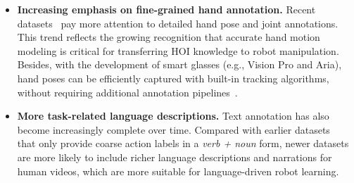 \documentclass[Afour,sageh,times]{sagej}
\begin{document}
\begin{itemize}[leftmargin=1em]
    \item \textbf{Increasing emphasis on fine-grained hand annotation.} Recent datasets~\citep{luo2025being,hoque2025egodex,qiu2025humanoid,luo2026being} pay more attention to detailed hand pose and joint annotations. This trend reflects the growing recognition that accurate hand motion modeling is critical for transferring HOI knowledge to robot manipulation. Besides, with the development of smart glasses (e.g., Vision Pro and Aria), hand poses can be efficiently captured with built-in tracking algorithms, without requiring additional annotation pipelines~\citep{hoque2025egodex,chavan2025indego,qiu2025humanoid}.
    \item \textbf{More task-related language descriptions.} Text annotation has also become increasingly complete over time. Compared with earlier datasets~\citep{kuehne2014language,caba2015activitynet,goyal2017something} that only provide coarse action labels in a \textit{verb + noun} form, newer datasets~\citep{chavan2025indego,zhao2025taste,chen2026action100m} are more likely to include richer language descriptions and narrations for human videos, which are more suitable for language-driven robot learning.
\end{itemize}
\end{document}
